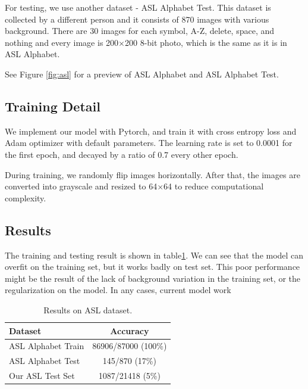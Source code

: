 \documentclass[10pt,twocolumn,letterpaper]{article}
\begin{document}
For testing, we use another dataset - ASL Alphabet Test\cite{noauthor_asl_nodate-1}. This dataset is collected by a different person and it consists of 870 images with various background. There are 30 images for each symbol, A-Z, delete, space, and nothing and every image is 200$\times$200 8-bit photo, which is the same as it is in ASL Alphabet. 

See Figure \ref{fig:asl} for a preview of ASL Alphabet and ASL Alphabet Test.

\subsection{Training Detail}\label{sec:training_detail}

We implement our model with Pytorch, and train it with cross entropy loss and Adam optimizer\cite{kingma2014adam} with default parameters. The learning rate is set to 0.0001 for the first epoch, and decayed by a ratio of 0.7 every other epoch. 

During training, we randomly flip images horizontally. After that, the images are converted into grayscale and resized to 64$\times$64 to reduce computational complexity. 

\subsection{Results}

The training and testing result is shown in table\ref{table:result}. We can see   that the model can overfit on the training set, but it works badly on test set. This poor performance might be the result of the lack of background variation in the training set, or the regularization on the model. In any cases, current model work 

\begin{table}[h]
\begin{center}
\begin{tabular}{|l|c|}
\hline
Dataset & Accuracy \\
\hline\hline
ASL Alphabet Train & 86906/87000 (100\%) \\
ASL Alphabet Test & 145/870 (17\%) \\
Our ASL Test Set & 1087/21418 (5\%) \\
\hline
\end{tabular}
\end{center}
\caption{Results on ASL dataset.}
\label{table:result}
\end{table}
\end{document}
